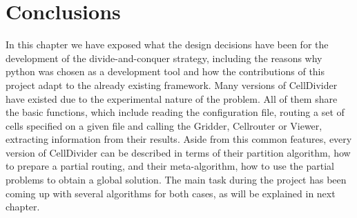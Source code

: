 \section{Conclusions}
In this chapter we have exposed what the design decisions have been for the development of the divide-and-conquer strategy, including the reasons why python was chosen as a development tool and how the contributions of this project adapt to the already existing framework. Many versions of CellDivider have existed due to the experimental nature of the problem. All of them share the basic functions, which include reading the configuration file, routing a set of cells specified on a given file and calling the Gridder, Cellrouter or Viewer, extracting information from their results. Aside from this common features, every version of CellDivider can be described in terms of their partition algorithm, how to prepare a partial routing, and their meta-algorithm, how to use the partial problems to obtain a global solution. The main task during the project has been coming up with several algorithms for both cases, as will be explained in next chapter.  \\


